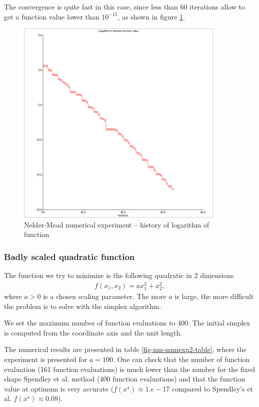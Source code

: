 The convergence is quite fast in this case, since less than 60 iterations
allow to get a function value lower than $10^{-15}$, as shown in 
figure \ref{fig-nm-numexp1-logfopt}.

\begin{figure}
\begin{center}
\includegraphics[width=10cm]{quad2bis-nm-history-logfopt.png}
\end{center}
\caption{Nelder-Mead numerical experiment -- history of logarithm of function}
\label{fig-nm-numexp1-logfopt}
\end{figure}

\subsubsection{Badly scaled quadratic function}

The function we try to minimize is the following quadratic 
in 2 dimensions 
\begin{eqnarray}
\label{quadratic-nm-function2}
f(x_1,x_2) = a x_1^2 + x_2^2,
\end{eqnarray}
where $a>0$ is a chosen scaling parameter. 
The more $a$ is large, the more difficult the problem is 
to solve with the simplex algorithm.

We set the maximum number of function evaluations to 400.
The initial simplex is computed from the coordinate axis and the unit length.

The numerical results are presented in table \ref{fig-nm-numexp2-table},
where the experiment is presented for $a=100$. One can check that the 
number of function evaluation (161 function evaluations) is much lower than the number 
for the fixed shape Spendley et al. method (400 function evaluations)
and that the function value at optimum is very accurate ($f(x^\star)\approx 1.e-17$
compared to Spendley's et al. $f(x^\star) \approx 0.08$).

